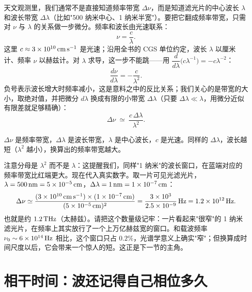 天文观测里，我们通常不是直接知道频率带宽 \(\Delta\nu\)，而是知道滤光片的中心波长 \(\lambda\) 和波长带宽 \(\Delta\lambda\)（比如"500 纳米中心、1 纳米半宽"）。要把它翻成频率带宽，只需对 \(\nu\) 与 \(\lambda\) 的关系做一步微分。频率和波长由光速联系：
\[
  \nu=\frac{c}{\lambda}.
\]
这里 \(c\approx3\times10^{10}\,{\rm cm\,s^{-1}}\) 是光速；沿用全书的 CGS 单位约定，波长 \(\lambda\) 以厘米计、频率 \(\nu\) 以赫兹计。对 \(\lambda\) 求导，这一步不能跳——用 \(\dfrac{d}{d\lambda}\bigl(c\lambda^{-1}\bigr)=-c\lambda^{-2}\)：
\[
  \frac{d\nu}{d\lambda}=-\frac{c}{\lambda^{2}}.
\]
负号表示波长增大时频率减小，这是意料之中的反比关系；我们关心的是带宽的大小，取绝对值，并把微分 \(d\lambda\) 换成有限的小带宽 \(\Delta\lambda\)（只要 \(\Delta\lambda\ll\lambda\)，用微分近似有限差就足够精确）：
\begin{equation}
  \Delta\nu\;\simeq\;\frac{c\,\Delta\lambda}{\lambda^{2}} .
  \label{eq:e02-bandwidth-conversion}
\end{equation}
\begin{formulaexplain}
\(\Delta\nu\) 是频率带宽，\(\Delta\lambda\) 是波长带宽，\(\lambda\) 是中心波长，\(c\) 是光速。同样的 \(\Delta\lambda\)，波长越短（\(\lambda^2\) 越小），换算出的频率带宽越大。
\end{formulaexplain}
注意分母是 \(\lambda^{2}\) 而不是 \(\lambda\)：这提醒我们，同样"1 纳米"的波长窗口，在蓝端对应的频率带宽比红端更大。现在代入真实数字。取一片可见光滤光片，\(\lambda=500\,{\rm nm}=5\times10^{-5}\,{\rm cm}\)，\(\Delta\lambda=1\,{\rm nm}=1\times10^{-7}\,{\rm cm}\)：
\[
  \Delta\nu\simeq
  \frac{(3\times10^{10}\,{\rm cm\,s^{-1}})\times(1\times10^{-7}\,{\rm cm})}
       {(5\times10^{-5}\,{\rm cm})^{2}}
  =\frac{3\times10^{3}}{2.5\times10^{-9}}\,{\rm Hz}
  =1.2\times10^{12}\,{\rm Hz}.
\]
也就是约 \(1.2\,{\rm THz}\)（太赫兹）。请把这个数量级记牢：一片看起来"很窄"的 1 纳米滤光片，在频率上其实放行了一个上万亿赫兹宽的窗口。和载波频率 \(\nu_0\sim6\times10^{14}\,{\rm Hz}\) 相比，这个窗口只占 \(0.2\%\)，光谱学意义上确实"窄"；但换算成时间尺度以后，它会带来一个惊人的短。这正是下一节的主角。

\section{相干时间：波还记得自己相位多久}
\label{sec:e02-coherence-time}


